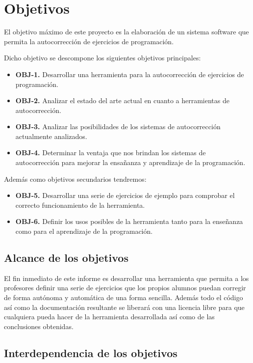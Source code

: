 \chapter{Objetivos}

El objetivo máximo de este proyecto es la elaboración de un sistema software que permita la autocorrección de ejercicios de programación.

\bigskip
Dicho objetivo se descompone los siguientes objetivos principales:

\begin{itemize}
  \item \textbf{OBJ-1.} Desarrollar una herramienta para la autocorrección de ejercicios de programación.
  \item \textbf{OBJ-2.} Analizar el estado del arte actual en cuanto a herramientas de autocorrección.
  \item \textbf{OBJ-3.} Analizar las posibilidades de los sistemas de autocorrección actualmente analizados.
  \item \textbf{OBJ-4.} Determinar la ventaja que nos brindan los sistemas de autocorrección para mejorar la ensañanza y aprendizaje de la programación.
\end{itemize}

Además como objetivos secundarios tendremos:

\begin{itemize}
  \item \textbf{OBJ-5.} Desarrollar una serie de ejercicios de ejemplo para comprobar el correcto funcionamiento de la herramienta.
  \item \textbf{OBJ-6.} Definir los usos posibles de la herramienta tanto para la enseñanza como para el aprendizaje de la programación.
\end{itemize}

\section{Alcance de los objetivos}
El fin inmediato de este informe es desarrollar una herramienta que permita a los profesores definir una serie de ejercicios que los propios alumnos puedan corregir de forma autónoma y automática de una forma sencilla.
Además todo el código así como la documentación resultante se liberará con una licencia libre para que cualquiera pueda hacer de la herramienta desarrollada así como de las conclusiones obtenidas.

\section{Interdependencia de los objetivos}

